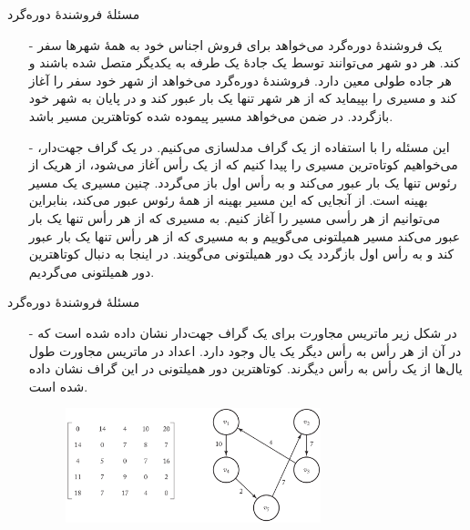 
\begin{frame}{مسئلهٔ فروشندهٔ دوره‌گرد}
\begin{itemize}\itemr
\item[-]
یک فروشندهٔ دوره‌گرد می‌خواهد برای فروش اجناس خود به همهٔ شهرها سفر کند.
هر دو شهر می‌توانند توسط یک جادهٔ یک طرفه به یکدیگر متصل شده باشند و هر جاده طولی معین دارد.
فروشندهٔ دوره‌گرد می‌خواهد از شهر خود سفر را آغاز کند و مسیری را بپیماید که از هر شهر تنها یک بار عبور کند و در پایان به شهر خود بازگردد.
در ضمن می‌خواهد مسیر پیموده شده کوتاهترین مسیر باشد.
\item[-]
این مسئله را با استفاده از یک گراف مدلسازی می‌کنیم.
در یک گراف جهت‌دار، می‌خواهیم کوتاه‌ترین مسیری را پیدا کنیم که از یک رأس آغاز می‌شود، از هریک از رئوس تنها یک بار عبور می‌کند و به رأس اول باز می‌گردد. چنین مسیری یک مسیر بهینه است. از آنجایی که این مسیر بهینه از همهٔ رئوس عبور می‌کند، بنابراین می‌توانیم از هر رأسی مسیر را آغاز کنیم. به مسیری که از هر رأس تنها یک بار عبور می‌کند مسیر همیلتونی می‌گوییم و به مسیری که از هر رأس تنها یک بار عبور کند و به رأس اول بازگردد یک دور همیلتونی می‌گویند. در اینجا به دنبال کوتاهترین دور همیلتونی می‌گردیم.
\end{itemize}
\end{frame}


\begin{frame}{مسئلهٔ فروشندهٔ دوره‌گرد}
\begin{itemize}\itemr
\item[-]
در شکل زیر ماتریس مجاورت برای یک گراف جهت‌دار نشان داده شده است که در آن از هر رأس به رأس دیگر یک یال وجود دارد. اعداد در ماتریس مجاورت طول یال‌ها از یک رأس به رأس دیگرند. کوتاهترین دور همیلتونی در این گراف نشان داده شده است.
\begin{figure}
\includegraphics[width=0.7\textwidth]{figs/chap06/263-tsp}
\end{figure}
\end{itemize}
\end{frame}


